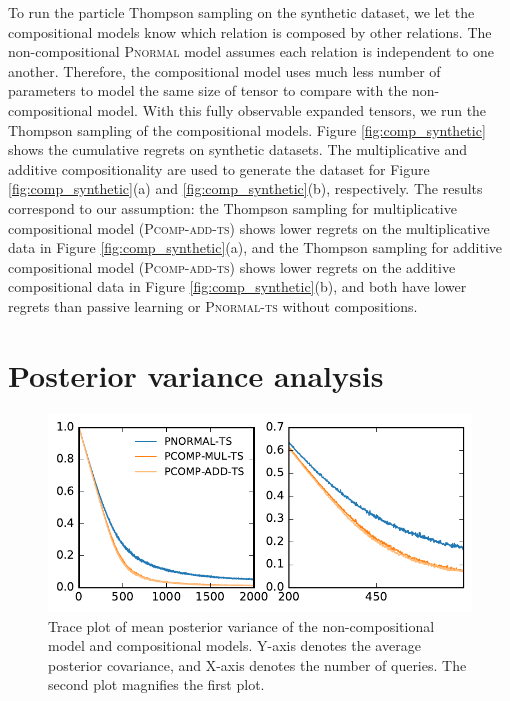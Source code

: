 To run the particle Thompson sampling on the synthetic dataset, we let the
compositional models know which relation is composed by other relations.
The non-compositional \textsc{Pnormal} model assumes each relation is independent to one another.
Therefore, the compositional model uses much less number of parameters to model
the same size of tensor to compare with the non-compositional model.
With this fully observable expanded tensors, we run the Thompson sampling of
the compositional models.
Figure \ref{fig:comp_synthetic} shows the cumulative regrets on synthetic
datasets. The multiplicative and additive compositionality are used to
generate the dataset for Figure \ref{fig:comp_synthetic}(a) and
\ref{fig:comp_synthetic}(b), respectively. The results correspond to our
assumption: the Thompson sampling for multiplicative compositional model (\textsc{Pcomp-add-ts}) shows lower
regrets on the multiplicative data in Figure \ref{fig:comp_synthetic}(a), and
the Thompson sampling for additive compositional model (\textsc{Pcomp-add-ts}) shows lower regrets on the
additive compositional data in Figure \ref{fig:comp_synthetic}(b),
and both have lower regrets than passive learning or \textsc{Pnormal-ts} without compositions.


\section{Posterior variance analysis}
\begin{figure}[t]
	\centering

	\includegraphics[width=0.9\linewidth]{images/posterior_variance_trace_kinship.pdf}

	\caption{\label{fig:pos_var} Trace plot of mean posterior variance of the non-compositional model and compositional models. Y-axis denotes the average posterior covariance, and X-axis denotes the number of queries. The second plot magnifies the first plot.}
\end{figure}

